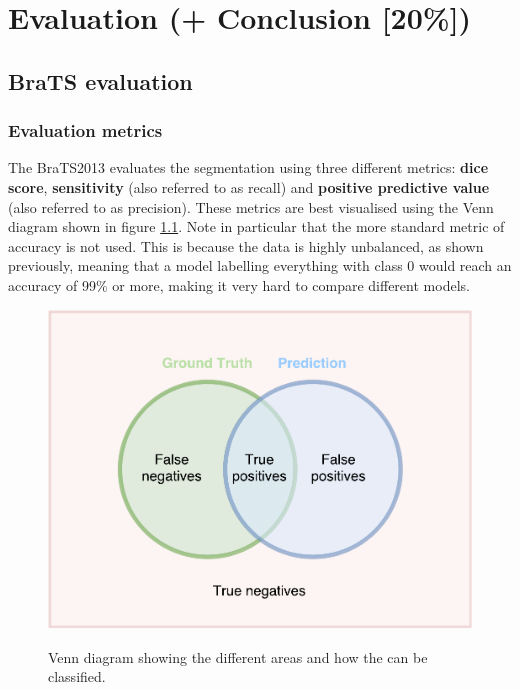 \documentclass[12pt,a4paper,twoside,openright]{report}
\begin{document}
\chapter{Evaluation (+ Conclusion [20\%])}

\section{BraTS evaluation}
\subsection{Evaluation metrics}
The BraTS2013\cite{brats-proceedings} evaluates the segmentation using three different metrics: \textbf{dice score}, \textbf{sensitivity} (also referred to as recall) and \textbf{positive predictive value} (also referred to as precision). These metrics are best visualised using the Venn diagram shown in figure \ref{fig:evaluation_venn_diagram}.  Note in particular that the more standard metric of accuracy is not used. This is because the data is highly unbalanced, as shown previously, meaning that a model labelling everything with class 0 would reach an accuracy of 99\% or more, making it very hard to compare different models.

\begin{figure}[h]
	\centering
	\includegraphics[scale = 0.5]{evaluation_venn_diagram}
	\label{fig:evaluation_venn_diagram}
	\caption{Venn diagram showing the different areas and how the can be classified.}
\end{figure}
\end{document}
